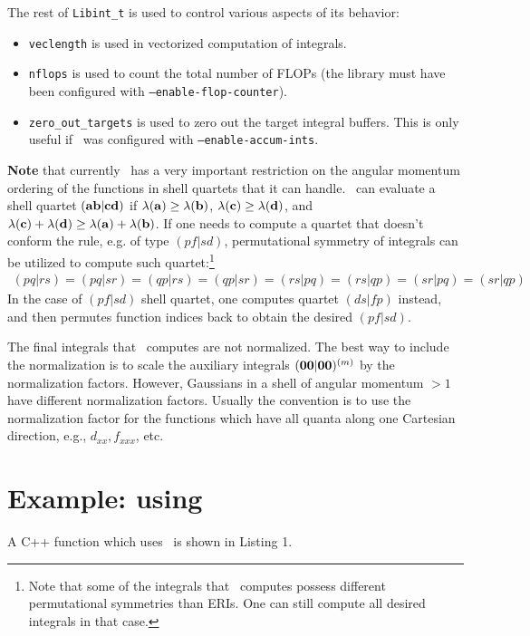 \documentclass[12pt]{article}
\begin{document}
The rest of {\tt Libint\_t} is used to control various aspects of its behavior:
\begin{itemize}
\item {\tt veclength} is used in vectorized computation of integrals.
\item {\tt nflops} is used to count the total number of FLOPs (the library must have been configured
  with {\tt --enable-flop-counter}).
\item {\tt zero\_out\_targets} is used to zero out the target integral buffers. This is only useful
  if \LIBINT\ was configured with {\tt --enable-accum-ints}.
\end{itemize}

{\bf Note} that currently \LIBINT\ has a very important restriction on the angular momentum ordering of the functions
in shell quartets that it can handle. \LIBINT\ can evaluate a shell quartet
$({\bf ab}|{\bf cd})$ if $\lambda({\bf a}) \geq \lambda({\bf b})$,
$\lambda({\bf c}) \geq \lambda({\bf d})$, and $\lambda({\bf c}) + \lambda({\bf d}) \geq \lambda({\bf a}) + \lambda({\bf b})$.
If one needs to compute a quartet that doesn't conform the rule, e.g. of type $(pf|sd)$,
permutational symmetry of integrals can be utilized to compute such quartet:\footnote{Note that some
of the integrals that \librij\ computes possess different permutational symmetries than ERIs. One can still
compute all desired integrals in that case.}
\begin{eqnarray}
(pq|rs) = (pq|sr) = (qp|rs) = (qp|sr) = (rs|pq) = (rs|qp)= (sr|pq) = (sr|qp)
\end{eqnarray}
In the case of $(pf|sd)$ shell quartet, one computes quartet $(ds|fp)$ instead, and then
permutes function indices back to obtain the desired $(pf|sd)$.

The final integrals that \LIBINT\ computes are not normalized. The best way to include the normalization
is to scale the auxiliary integrals $({\bf 00}|{\bf 00})^{(m)}$ by the normalization factors.
However, Gaussians in a shell of angular momentum $>1$ have different normalization factors.
Usually the convention is to use the normalization factor for the functions which have all quanta along
one Cartesian direction, e.g., $d_{xx}, f_{xxx}$, etc.

\section{Example: using \libint}

A C++ function which uses \LIBINT\ is shown in Listing 1.
\end{document}
